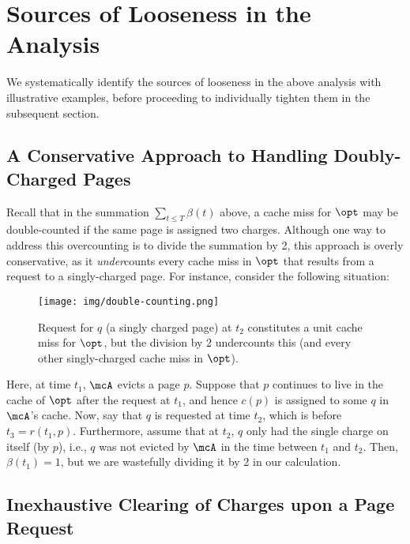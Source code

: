 \section{Sources of Looseness in the Analysis}
\label{sec:looseness}
We systematically identify the sources of looseness in the above analysis with illustrative examples, before proceeding to individually tighten them in the subsequent section.

\subsection{A Conservative Approach to Handling Doubly-Charged Pages}
\label{sec:looseness-double-counting}

Recall that in the summation $\sum_{t \le T} \beta(t)$ above, a cache miss for $\opt$ may be double-counted if the same page is assigned two charges. Although one way to address this overcounting is to divide the summation by 2, this approach is overly conservative, as it \textit{under}counts every cache miss in $\opt$ that results from a request to a singly-charged page. For instance, consider the following situation:
\begin{figure}[H]
    \centering
    \texttt{[image: img/double-counting.png]}
    \caption{Request for $q$ (a singly charged page) at $t_2$ constitutes a unit cache miss for $\opt$, but the division by 2 undercounts this (and every other singly-charged cache miss in $\opt$).}
    \label{fig:double-counting}
\end{figure}
Here, at time $t_1$, $\mcA$ evicts a page $p$. Suppose that $p$ continues to live in the cache of $\opt$ after the request at $t_1$, and hence $c(p)$ is assigned to some $q$ in $\mcA$'s cache. Now, say that $q$ is requested at time $t_2$, which is before $t_3=r(t_1, p)$. Furthermore, assume that at $t_2$, $q$ only had the single charge on itself (by $p$), i.e., $q$ was not evicted by $\mcA$ in the time between $t_1$ and $t_2$. Then, $\beta(t_1)=1$, but we are wastefully dividing it by 2 in our calculation.

\subsection{Inexhaustive Clearing of Charges upon a Page Request}
\label{sec:looseness-uncleared-charges}

